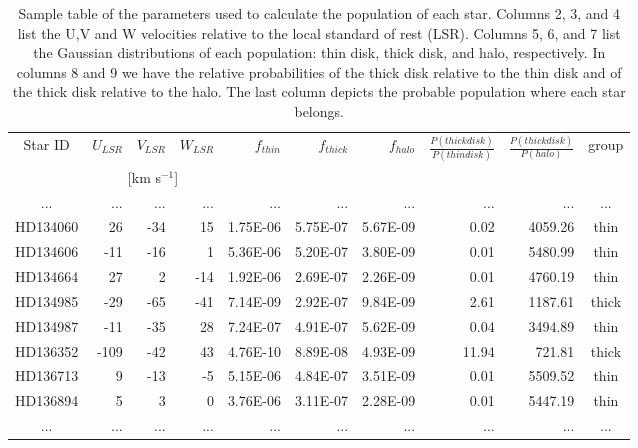 \documentclass[oldversion]{aa}
\newcommand\T{\rule{0pt}{2.6ex}}
\newcommand\B{\rule[-1.2ex]{0pt}{0pt}}
\begin{document}
\begin{table}[t!] %
  \centering
\caption[]{Sample table of the parameters used to calculate the population of each star. Columns 2, 3, and 4 list the U,V and W velocities relative to the local standard of rest (LSR). Columns 5, 6, and 7 list the Gaussian distributions of each population: thin disk, thick disk, and halo, respectively. In columns 8 and 9 we have the relative probabilities of the thick disk relative to the thin disk and of the thick disk relative to the halo. The last column depicts the probable population where each star belongs.}
  \label{table:disk_data}
  \begin{tabular}{ c r r r r r r r r c}
  \hline
  \hline
  
  
Star ID \T & $U_{LSR}$ & $V_{LSR}$ & $W_{LSR}$ & $f_{thin}$ & $f_{thick}$ & $f_{halo}$ & $\frac{P(thickdisk)}{P(thindisk)}$ & $\frac{P(thickdisk)}{P(halo)}$ & group \\
  \B&  \multicolumn {3}{c}{[km s$^{-1}$]} &	&	&	&	&	&	\\
\hline
... & ... & ... & ... & ... & ... & ... & ... & ... & ... \\
HD134060 &   26 &  -34 &   15 &   1.75E-06 &   5.75E-07 &   5.67E-09 &      0.02 & 4059.26 & thin \\
HD134606 &  -11 &  -16 &    1 &   5.36E-06 &   5.20E-07 &   3.80E-09 &      0.01 & 5480.99 & thin \\
HD134664 &   27 &    2 &  -14 &   1.92E-06 &   2.69E-07 &   2.26E-09 &      0.01 & 4760.19 & thin \\
HD134985 &  -29 &  -65 &  -41 &   7.14E-09 &   2.92E-07 &   9.84E-09 &      2.61 & 1187.61 & thick \\
HD134987 &  -11 &  -35 &   28 &   7.24E-07 &   4.91E-07 &   5.62E-09 &      0.04 & 3494.89 & thin \\
HD136352 & -109 &  -42 &   43 &   4.76E-10 &   8.89E-08 &   4.93E-09 &     11.94 &  721.81 & thick \\
HD136713 &    9 &  -13 &   -5 &   5.15E-06 &   4.84E-07 &   3.51E-09 &      0.01 & 5509.52 & thin \\
HD136894 &    5 &    3 &    0 &   3.76E-06 &   3.11E-07 &   2.28E-09 &      0.01 & 5447.19 & thin \\
... & ... & ... & ... & ... & ... & ... & ... & ... & ... \\
\hline
\end{tabular}
\end{table}
\end{document}
